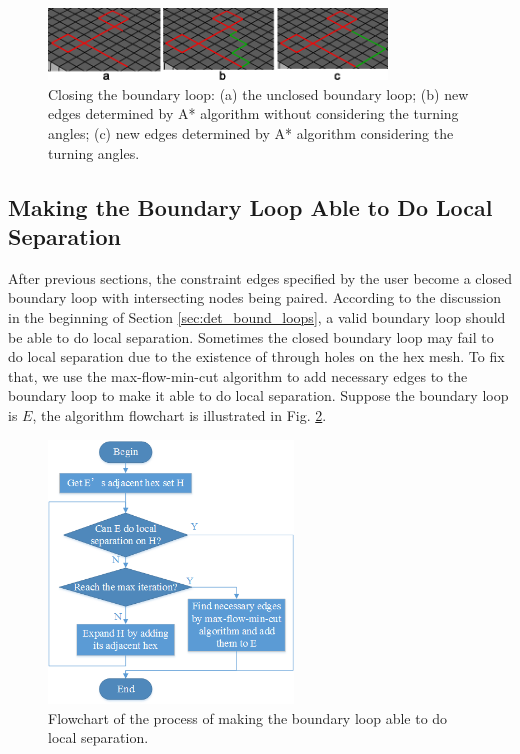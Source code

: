 \documentclass[final,5p,times,twocolumn]{elsarticle}
\begin{document}
\begin{figure}[htbp]
\begin{center}
\includegraphics[width=9cm]{figures/close_loop.png}
\caption{Closing the boundary loop: (a) the unclosed boundary loop; (b) new edges determined by A* algorithm without considering the turning angles; (c) new edges determined by A* algorithm considering the turning angles.}
\label{fig:close_loop}
\end{center}
\end{figure}

\subsection{Making the Boundary Loop Able to Do Local Separation}
\label{sec:local_separation}
After previous sections, the constraint edges specified by the user become a closed boundary loop with intersecting nodes being paired. According to the discussion in the beginning of Section \ref{sec:det_bound_loops}, a valid boundary loop should be able to do local separation. Sometimes the closed boundary loop may fail to do local separation due to the existence of through holes on the hex mesh. To fix that, we use the max-flow-min-cut algorithm to add necessary edges to the boundary loop to make it able to do local separation. Suppose the boundary loop is $E$, the algorithm flowchart is illustrated in Fig. \ref{fig:flow_local_sep}.

\begin{figure}[htbp]
\begin{center}
\includegraphics[width=6.5cm]{figures/flow_local_separation.png}
\caption{Flowchart of the process of making the boundary loop able to do local separation.}
\label{fig:flow_local_sep}
\end{center}
\end{figure}
\end{document}
